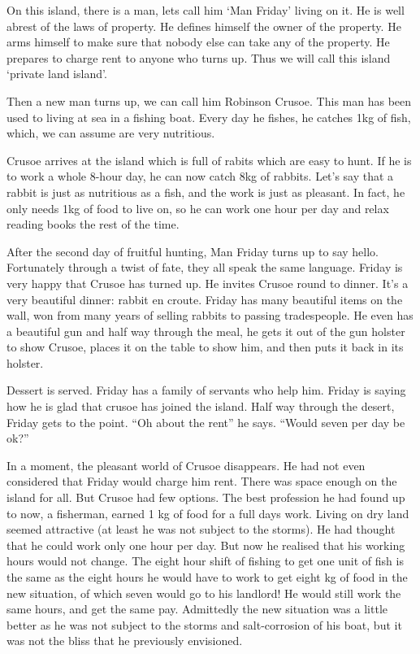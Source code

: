 \documentclass[]{tufte-handout}
\begin{document}
On this island, there is a man, lets call him `Man Friday' living on it.
He is well abrest of the laws of property. He defines himself the owner
of the property. He arms himself to make sure that nobody else can take
any of the property. He prepares to charge rent to anyone who turns up.
Thus we will call this island `private land island'.

Then a new man turns up, we can call him Robinson Crusoe. This man has
been used to living at sea in a fishing boat. Every day he fishes, he
catches 1kg of fish, which, we can assume are very nutritious.

Crusoe arrives at the island which is full of rabits which are easy to
hunt. If he is to work a whole 8-hour day, he can now catch 8kg of
rabbits. Let's say that a rabbit is just as nutritious as a fish, and
the work is just as pleasant. In fact, he only needs 1kg of food to live
on, so he can work one hour per day and relax reading books the rest of
the time.

After the second day of fruitful hunting, Man Friday turns up to say
hello. Fortunately through a twist of fate, they all speak the same
language. Friday is very happy that Crusoe has turned up. He invites
Crusoe round to dinner. It's a very beautiful dinner: rabbit en croute.
Friday has many beautiful items on the wall, won from many years of
selling rabbits to passing tradespeople. He even has a beautiful gun and
half way through the meal, he gets it out of the gun holster to show
Crusoe, places it on the table to show him, and then puts it back in its
holster.

Dessert is served. Friday has a family of servants who help him. Friday
is saying how he is glad that crusoe has joined the island. Half way
through the desert, Friday gets to the point. ``Oh about the rent'' he
says. ``Would seven per day be ok?''

In a moment, the pleasant world of Crusoe disappears. He had not even
considered that Friday would charge him rent. There was space enough on
the island for all. But Crusoe had few options. The best profession he
had found up to now, a fisherman, earned 1 kg of food for a full days
work. Living on dry land seemed attractive (at least he was not subject
to the storms). He had thought that he could work only one hour per day.
But now he realised that his working hours would not change. The eight
hour shift of fishing to get one unit of fish is the same as the eight
hours he would have to work to get eight kg of food in the new
situation, of which seven would go to his landlord! He would still work
the same hours, and get the same pay. Admittedly the new situation was a
little better as he was not subject to the storms and salt-corrosion of
his boat, but it was not the bliss that he previously envisioned.
\end{document}
